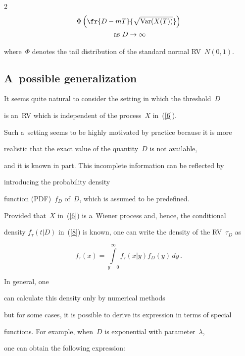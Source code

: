 \begin{multicols}{2}
\begin{multline*}
\Phi \left( \fr{D-mT}{\sqrt{\mathrm{Var}(X(T))}} \right)\\

 \mbox{ as } D \to \infty

\end{multline*}

where~$\Phi$ denotes the tail distribution of the standard normal RV~$N(0,1)$.



\subsection{A~possible  generalization} 







 \noindent

 It seems quite natural to consider the setting in which the threshold~$D$  

 is an~RV which is independent of the process~$X$ in~(\ref{6}). 

 Such a~setting seems to be highly motivated by practice because it is more 

 realistic that the exact value of   the quantity~$D$ is not available, 

 and it is known in part. This incomplete information can be reflected by  

 introducing the probability density

 function (PDF)~$f_D$ of~$D$, which is assumed to be predefined.   

 Provided that~$X$ in~(\ref{6}) is  a~Wiener process and, hence, the conditional 

 density $f_\tau(t|D)$ in~(\ref{8}) is known, one can write  the density of the RV~$\tau_D$ as

$$

f_\tau(x)=\int\limits_{y=0}^\infty 

f_\tau(x|y)f_D(y)\,dy\,.

$$

In general, one

can calculate this density only by numerical methods 

but for some cases, it is possible to derive its expression in terms of special

 functions. For example, when~$D$  is  exponential with parameter~$\lambda$, 

 one can obtain the following expression:


\end{multicols}
